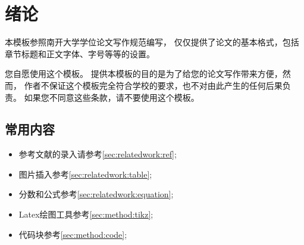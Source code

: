 \documentclass[12pt,openright]{book}
\begin{document}
\chapter{绪论}
\label{chpt:introduction}


本模板参照南开大学学位论文写作规范编写，
仅仅提供了论文的基本格式，包括章节标题和正文字体、字号等等的设置。



您自愿使用这个模板。
提供本模板的目的是为了给您的论文写作带来方便，然而，
作者不保证这个模板完全符合学校的要求，也不对由此产生的任何后果负责。
如果您不同意这些条款，请不要使用这个模板。


\section{常用内容}

\begin{itemize}
  \item 参考文献的录入请参考\ref{sec:relatedwork:ref};
  \item 图片插入参考\ref{sec:relatedwork:table};
  \item 分数和公式参考\ref{sec:relatedwork:equation};  
  \item Latex绘图工具参考\ref{sec:method:tikz};
  \item 代码块参考\ref{sec:method:code}; 
\end{itemize}
\end{document}
